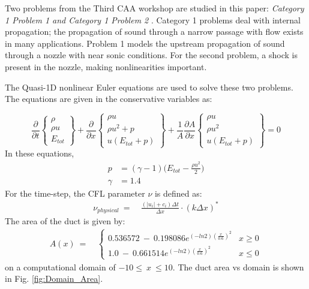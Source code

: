 \documentclass[conf]{new-aiaa}
\begin{document}
Two problems from the Third CAA workshop are studied in this paper: \textit{Category 1 Problem 1 and Category 1 Problem 2} \cite{CAA3}. 
Category 1 problems deal with internal propagation; 
the propagation of sound through a narrow passage with flow exists in many applications. 
Problem 1 models the upstream propagation of sound through a nozzle with near sonic conditions. 
For the second problem, a shock is present in the nozzle, making nonlinearities important. 


The Quasi-1D nonlinear Euler equations are used to solve these two problems. The equations are given in the conservative variables as:

\begin{equation}
    \label{eq:Euler}
    \frac{\partial{}}{\partial{t}} 
    \begin{Bmatrix}
        \rho \\
        \rho{u} \\
        E_{tot}
  \end{Bmatrix}+\frac{\partial{}}{\partial{x}}
    \begin{Bmatrix}
        \rho{u} \\
        \rho{u^2}+p \\
        u(E_{tot}+p)
  \end{Bmatrix} +\frac{1}{A}\frac{\partial{A}}{\partial{x}}
    \begin{Bmatrix}
        \rho{u} \\
        \rho{u^2} \\
        u(E_{tot}+p)
  \end{Bmatrix}= 0
\end{equation}
In these equations,
\begin{equation}
    \label{eq:Euler_pressure}
    \begin{split}
    p &= (\gamma-1)\Big(E_{tot}-\frac{\rho{u^2}}{2}\Big) \\
    \gamma &= 1.4
    \end{split}
\end{equation}
For the time-step, the CFL parameter $\nu$ is defined as:
\begin{equation}
	\begin{split}
		\label{eq:}
  			\nu_{physical}
  			~=&~\frac{\left(\left|u_i\right|+c_i\right)\Delta{t}}{\Delta{x}}\cdot\left(k\Delta{x}\right)^*
	\end{split}
\end{equation}
The area of the duct is given by:
\begin{equation}
	\begin{split}
		\label{eq:}
  			A(x)~=&~\left\{
  			\begin{matrix}
  				0.536572~-~0.198086e^{\left(-ln2\right)\left(\frac{x}{0.6}\right)^2} & x \geq 0 \\
  				1.0~-~0.661514e^{\left(-ln2\right)\left(\frac{x}{0.6}\right)^2} & x \leq 0
  			\end{matrix}
  			\right.
	\end{split}
\end{equation}
on a computational domain of $-10\leq~x~\leq10$. The duct area vs domain is shown in Fig. \ref{fig:Domain_Area}.
\end{document}
